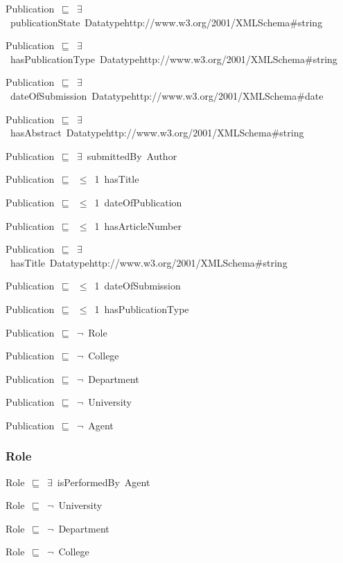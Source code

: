 \documentclass{article}
\begin{document}
Publication~\ensuremath{\sqsubseteq}~\ensuremath{\exists}~publicationState~Datatypehttp://www.w3.org/2001/XMLSchema#string~

Publication~\ensuremath{\sqsubseteq}~\ensuremath{\exists}~hasPublicationType~Datatypehttp://www.w3.org/2001/XMLSchema#string~

Publication~\ensuremath{\sqsubseteq}~\ensuremath{\exists}~dateOfSubmission~Datatypehttp://www.w3.org/2001/XMLSchema#date~

Publication~\ensuremath{\sqsubseteq}~\ensuremath{\exists}~hasAbstract~Datatypehttp://www.w3.org/2001/XMLSchema#string~

Publication~\ensuremath{\sqsubseteq}~\ensuremath{\exists}~submittedBy~Author~

Publication~\ensuremath{\sqsubseteq}~\ensuremath{\leq}~1~hasTitle~

Publication~\ensuremath{\sqsubseteq}~\ensuremath{\leq}~1~dateOfPublication~

Publication~\ensuremath{\sqsubseteq}~\ensuremath{\leq}~1~hasArticleNumber~

Publication~\ensuremath{\sqsubseteq}~\ensuremath{\exists}~hasTitle~Datatypehttp://www.w3.org/2001/XMLSchema#string~

Publication~\ensuremath{\sqsubseteq}~\ensuremath{\leq}~1~dateOfSubmission~

Publication~\ensuremath{\sqsubseteq}~\ensuremath{\leq}~1~hasPublicationType~

Publication~\ensuremath{\sqsubseteq}~\ensuremath{\lnot}~Role

Publication~\ensuremath{\sqsubseteq}~\ensuremath{\lnot}~College

Publication~\ensuremath{\sqsubseteq}~\ensuremath{\lnot}~Department

Publication~\ensuremath{\sqsubseteq}~\ensuremath{\lnot}~University

Publication~\ensuremath{\sqsubseteq}~\ensuremath{\lnot}~Agent

\subsubsection*{Role}

Role~\ensuremath{\sqsubseteq}~\ensuremath{\exists}~isPerformedBy~Agent~

Role~\ensuremath{\sqsubseteq}~\ensuremath{\lnot}~University

Role~\ensuremath{\sqsubseteq}~\ensuremath{\lnot}~Department

Role~\ensuremath{\sqsubseteq}~\ensuremath{\lnot}~College
\end{document}
